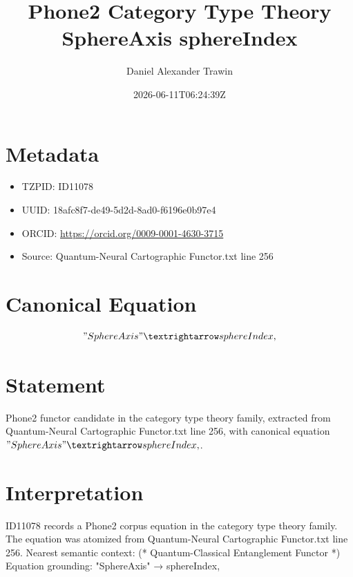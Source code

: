 \documentclass[11pt]{article}
\title{Phone2 Category Type Theory SphereAxis sphereIndex}
\author{Daniel Alexander Trawin}
\date{2026-06-11T06:24:39Z}
\begin{document}
\maketitle
\section*{Metadata}
\begin{itemize}
\item TZPID: ID11078
\item UUID: 18afc8f7-de49-5d2d-8ad0-f6196e0b97e4
\item ORCID: \url{https://orcid.org/0009-0001-4630-3715}
\item Source: Quantum-Neural Cartographic Functor.txt line 256
\end{itemize}
\section*{Canonical Equation}
\[
"SphereAxis" → sphereIndex,
\]
\section*{Statement}
Phone2 functor candidate in the category type theory family, extracted from Quantum-Neural Cartographic Functor.txt line 256, with canonical equation $"SphereAxis" → sphereIndex,$.
\section*{Interpretation}
ID11078 records a Phone2 corpus equation in the category type theory family. The equation was atomized from Quantum-Neural Cartographic Functor.txt line 256. Nearest semantic context: (* Quantum-Classical Entanglement Functor *) Equation grounding: "SphereAxis" → sphereIndex,
\end{document}
